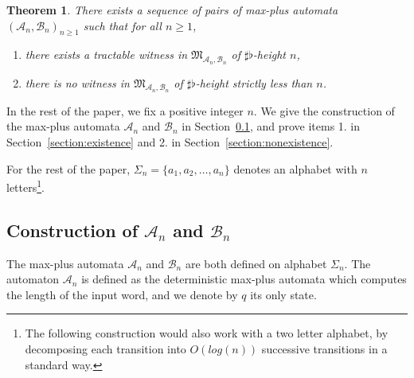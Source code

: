 \documentclass[10pt,a4paper]{amsart}
\newtheorem{thm}{Theorem}[section]
\theoremstyle{definition}
\numberwithin{equation}{section}
\theoremstyle{remark}
\newcommand{\ideal}{\mathfrak{M}}
\newcommand{\autA}{\mathcal{A}}
\newcommand{\autB}{\mathcal{B}}
\theoremstyle{remark}
\begin{document}
\begin{thm}
There exists a sequence of pairs of max-plus automata $(\autA_n, \autB_n)_{n \geq 1}$ such that for all $n \geq 1$,
\begin{enumerate}
\item there exists a tractable witness in $\ideal_{\autA_n,\autB_n}$ of $\sharp\flat$-height $n$,
\item there is no witness in $\ideal_{\autA_n,\autB_n}$ of $\sharp\flat$-height strictly less than $n$.
\end{enumerate}
\end{thm}


In the rest of the paper, we fix a positive integer $n$. We give the construction of the max-plus automata $\autA_n$ and $\autB_n$ in Section~\ref{section:constructionAB}, and prove items 1. in Section~\ref{section:existence} and 2. in Section~\ref{section:nonexistence}.

For the rest of the paper, $\Sigma_n = \{a_1, a_2, \ldots, a_n\}$ denotes an alphabet with $n$ letters\footnote{The following construction would also work with a two letter alphabet, by decomposing each transition into $O(log(n))$ successive transitions in a standard way.}. 

\subsection{Construction of \texorpdfstring{$\autA_n$}{A\_n} and \texorpdfstring{$\autB_n$}{B\_n}}
\label{section:constructionAB}

The max-plus automata $\autA_n$ and $\autB_n$ are both defined on alphabet $\Sigma_n$.
The automaton $\autA_n$ is defined as the deterministic max-plus automata which computes the length of the input word, and we denote by $q$ its only state. 

\begin{center}
\end{center}
\end{document}
